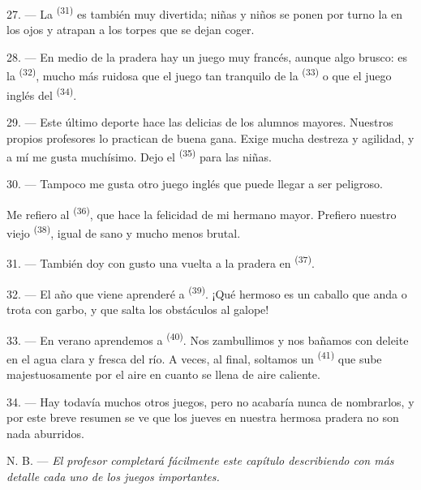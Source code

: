\VUsaut{5.0mm}
\VUsaut{3.4mm}

27. --- La  \textsuperscript{(31)} es también muy divertida;
niñas y niños se ponen por turno la  en los ojos y atrapan a
los torpes que se dejan coger.

28. --- En medio de la pradera hay un juego muy francés, aunque algo
brusco: es la  \textsuperscript{(32)}, mucho más ruidosa que el juego
tan tranquilo de la  \textsuperscript{(33)} o que el juego inglés del
 \textsuperscript{(34)}.

29. --- Este último deporte hace las delicias de los alumnos mayores.
Nuestros propios profesores lo practican de buena gana. Exige mucha
destreza y agilidad, y a mí me gusta muchísimo. Dejo el 
\textsuperscript{(35)} para las niñas.

30. --- Tampoco me gusta otro juego inglés que puede llegar a ser
peligroso.

Me refiero al  \textsuperscript{(36)}, que hace la felicidad de mi
hermano mayor. Prefiero nuestro viejo 
\textsuperscript{(38)}, igual de sano y mucho menos brutal.

\VUsaut{4.6mm}
\VUsaut{3.0mm}

31. --- También doy con gusto una vuelta a la pradera en 
\textsuperscript{(37)}.

32. --- El año que viene aprenderé a 
\textsuperscript{(39)}. ¡Qué hermoso es un caballo que anda o trota con garbo, y
que salta los obstáculos al galope!

33. --- En verano aprendemos a  \textsuperscript{(40)}. Nos zambullimos
y nos bañamos con deleite en el agua clara y fresca del río. A veces, al
final, soltamos un  \textsuperscript{(41)} que sube
majestuosamente por el aire en cuanto se llena de aire caliente.

34. --- Hay todavía muchos otros juegos, pero no acabaría nunca de
nombrarlos, y por este breve resumen se ve que los jueves en nuestra
hermosa pradera no son nada aburridos.

N. B. --- \textit{El profesor completará fácilmente este capítulo
describiendo con más detalle cada uno de los juegos importantes.}
\VUsaut{6.0mm}
\VUfilet{22mm}
